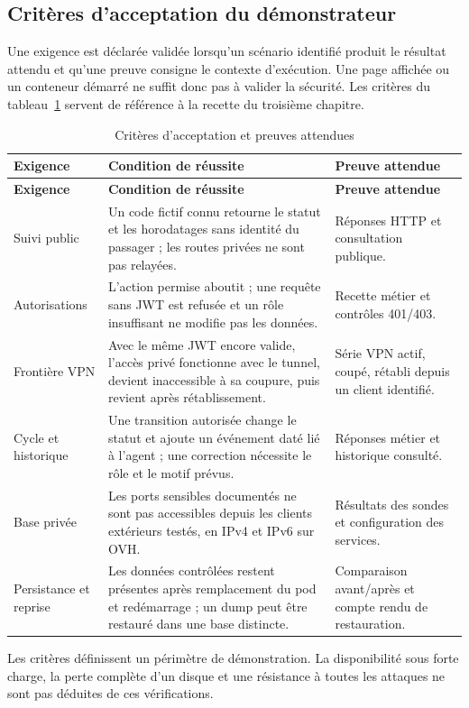\documentclass[11pt]{extarticle}
\begin{document}
\subsection{Critères d'acceptation du démonstrateur}
Une exigence est déclarée validée lorsqu'un scénario identifié produit le résultat attendu et qu'une preuve consigne le contexte d'exécution. Une page affichée ou un conteneur démarré ne suffit donc pas à valider la sécurité. Les critères du tableau~\ref{tab:acceptation} servent de référence à la recette du troisième chapitre.
{
\begin{longtable}{p{2.8cm}p{6.7cm}p{3.8cm}}
\caption{Critères d'acceptation et preuves attendues}\label{tab:acceptation}\\\toprule
\textbf{Exigence} & \textbf{Condition de réussite} & \textbf{Preuve attendue}\\\midrule\endfirsthead
\toprule\textbf{Exigence} & \textbf{Condition de réussite} & \textbf{Preuve attendue}\\\midrule\endhead
Suivi public & Un code fictif connu retourne le statut et les horodatages sans identité du passager ; les routes privées ne sont pas relayées. & Réponses HTTP et consultation publique.\\
Autorisations & L'action permise aboutit ; une requête sans JWT est refusée et un rôle insuffisant ne modifie pas les données. & Recette métier et contrôles 401/403.\\
Frontière VPN & Avec le même JWT encore valide, l'accès privé fonctionne avec le tunnel, devient inaccessible à sa coupure, puis revient après rétablissement. & Série VPN actif, coupé, rétabli depuis un client identifié.\\
Cycle et historique & Une transition autorisée change le statut et ajoute un événement daté lié à l'agent ; une correction nécessite le rôle et le motif prévus. & Réponses métier et historique consulté.\\
Base privée & Les ports sensibles documentés ne sont pas accessibles depuis les clients extérieurs testés, en IPv4 et IPv6 sur OVH. & Résultats des sondes et configuration des services.\\
Persistance et reprise & Les données contrôlées restent présentes après remplacement du pod et redémarrage ; un dump peut être restauré dans une base distincte. & Comparaison avant/après et compte rendu de restauration.\\\bottomrule
\end{longtable}}
Les critères définissent un périmètre de démonstration. La disponibilité sous forte charge, la perte complète d'un disque et une résistance à toutes les attaques ne sont pas déduites de ces vérifications.
\end{document}
